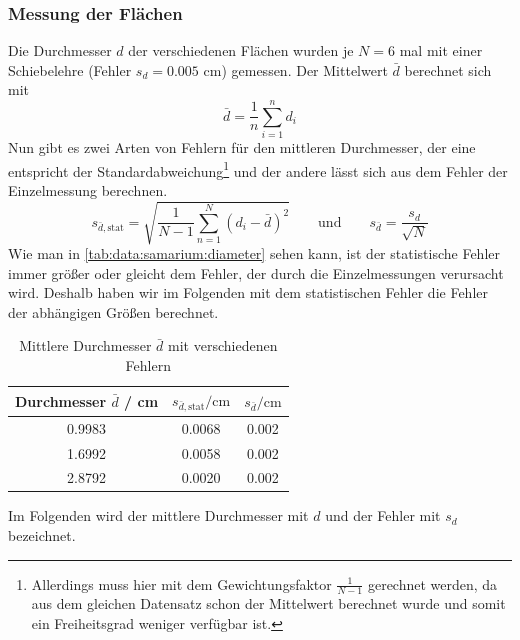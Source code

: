 \subsubsection{Messung der Flächen}
Die Durchmesser $d$ der verschiedenen Flächen wurden je $N = 6$ mal mit einer Schiebelehre (Fehler $s_d = 0.005$ cm) gemessen. Der Mittelwert $\bar{d}$ berechnet sich mit
\begin{equation}
  \bar{d} = \frac{1}{n} \sum_{i=1}^{n} d_i
\end{equation}
Nun gibt es zwei Arten von Fehlern für den mittleren Durchmesser, der eine entspricht der Standardabweichung\footnote{Allerdings muss hier mit 
dem Gewichtungsfaktor $\frac{1}{N-1}$ gerechnet werden, da aus dem gleichen Datensatz schon der Mittelwert berechnet wurde und somit ein Freiheitsgrad 
weniger verfügbar ist.} 
und der andere lässt sich aus dem Fehler der Einzelmessung berechnen.
\begin{equation}
  s_{\bar{d}, \text{stat}} = \sqrt{\frac{1}{N-1} \sum_{n=1}^{N} \left( d_i - \bar{d} \right)^2} \qquad \text{und} \qquad 
  s_{\bar{d}} = \frac{s_d}{\sqrt{N}} 
\end{equation}
Wie man in \autoref{tab:data:samarium:diameter} sehen kann, ist der statistische Fehler immer größer oder gleicht dem Fehler, der durch die Einzelmessungen 
verursacht wird. Deshalb haben wir im Folgenden mit dem statistischen Fehler die Fehler der abhängigen Größen berechnet.
\begin{table}[H]
\caption{Mittlere Durchmesser $\bar{d}$ mit verschiedenen Fehlern}
\begin{center}
\begin{tabular}{|c|c|c|}
  \hline
  \rule{0pt}{1em} Durchmesser $\bar{d}$ / cm & $s_{\bar{d}, \text{stat}} / \text{cm}$ & $s_{\bar{d}} / \text{cm}$  \\ \hline %
  0.9983 & 0.0068 & 0.002 \\ \hline
  1.6992 & 0.0058 & 0.002 \\ \hline
  2.8792 & 0.0020 & 0.002 \\ \hline
\end{tabular}
\end{center}
\label{tab:data:samarium:diameter}
\end{table}
Im Folgenden wird der mittlere Durchmesser mit $d$ und der Fehler mit $s_d$ bezeichnet.
